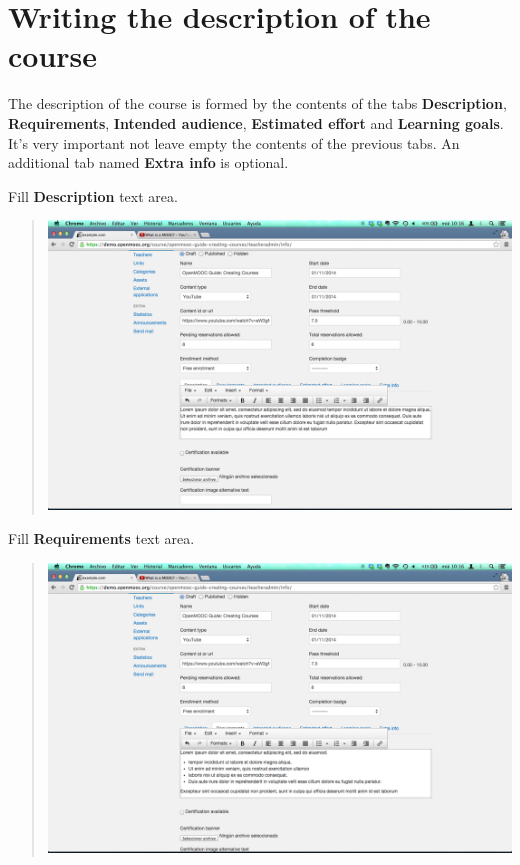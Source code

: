 \documentclass[letterpaper,10pt,english]{sphinxmanual}
\begin{document}
\section{Writing the description of the course}
\label{course_page:writing-the-description-of-the-course}
The description of the course is formed by the contents of the tabs \textbf{Description}, \textbf{Requirements},
\textbf{Intended audience}, \textbf{Estimated effort} and \textbf{Learning goals}. It's very important not leave empty
the contents of the previous tabs. An additional tab named \textbf{Extra info} is optional.

Fill \textbf{Description} text area.
\begin{quote}

\includegraphics{2_course_information-6.png}
\end{quote}

Fill \textbf{Requirements} text area.
\begin{quote}

\includegraphics{2_course_information-7.png}
\end{quote}
\end{document}
